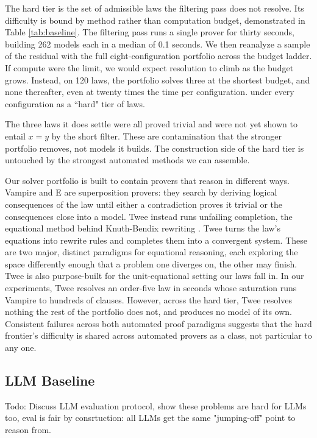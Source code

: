\documentclass[letterpaper]{article} %
\begin{document}
The hard tier is the set of admissible laws the filtering pass does not resolve. Its difficulty is bound by method rather than computation budget, demonstrated in Table \ref{tab:baseline}. The filtering pass runs a single prover for thirty seconds, building 262 models each in a median of 0.1 seconds. We then reanalyze a sample of the residual with the full eight-configuration portfolio across the budget ladder. If compute were the limit, we would expect resolution to climb as the budget grows. Instead, on 120 laws, the portfolio solves three at the shortest budget, and none thereafter, even at twenty times the time per configuration. 
under every configuration as a ``hard" tier of laws.

The three laws it does settle were all proved trivial and were not yet shown to entail $x = y$ by the short filter. These are contamination that the stronger portfolio removes, not models it builds. The construction side of the hard tier is untouched by the strongest automated methods we can assemble. 

Our solver portfolio is built to contain provers that reason in different ways. Vampire and E are superposition provers: they search by deriving logical consequences of the law until either a contradiction proves it trivial or the consequences close into a model. Twee instead runs unfailing completion, the equational method behind Knuth-Bendix rewriting \citep{...}. Twee turns the law's equations into rewrite rules and completes them into a convergent system. These are two major, distinct paradigms for equational reasoning, each exploring the space differently enough that a problem one diverges on, the other may finish. Twee is also purpose-built for the unit-equational setting our laws fall in. In our experiments, Twee resolves an order-five law in seconds whose saturation runs Vampire to hundreds of clauses. However, across the hard tier, Twee resolves nothing the rest of the portfolio does not, and produces no model of its own. Consistent failures across both automated proof paradigms suggests that the hard frontier's difficulty is shared across automated provers as a class, not particular to any one. 



\subsection{LLM Baseline}
Todo: Discuss LLM evaluation protocol, show these problems are hard for LLMs too, eval is fair by consrtuction: all LLMs get the same "jumping-off" point to reason from. 
\end{document}
